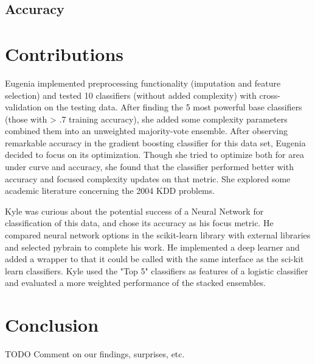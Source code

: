 \documentclass{article}
\begin{document}
\subsection{Accuracy}


\section{Contributions}

Eugenia implemented preprocessing functionality (imputation and feature selection) and tested 10 classifiers (without added complexity) with cross-validation on the testing data. 
After finding the 5 most powerful base classifiers (those with > .7 training accuracy), she added some complexity parameters combined them into an unweighted majority-vote ensemble. 
After observing remarkable accuracy in the gradient boosting classifier for this data set, Eugenia decided to focus on its optimization.
Though she tried to optimize both for area under curve and accuracy, she found that the classifier performed better with accuracy and focused complexity updates on that metric.
She explored some academic literature concerning the 2004 KDD problems.

Kyle was curious about the potential success of a Neural Network for classification of this data, and chose its accuracy as his focus metric. 
He compared neural network options in the scikit-learn library with external libraries and selected pybrain to complete his work.
He implemented a deep learner and added a wrapper to that it could be called with the same interface as the sci-kit learn classifiers.
Kyle used the "Top 5" classifiers as features of a logistic classifier and evaluated a more weighted performance of the stacked ensembles.


\section{Conclusion}

TODO Comment on our findings, surprises, etc.
\end{document}
